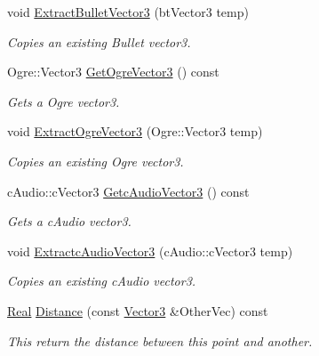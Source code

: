 \begin{DoxyCompactItemize}
void \hyperlink{classphys_1_1Vector3_a24ae86b068340be6727877f8c6c1a313}{ExtractBulletVector3} (btVector3 temp)
\begin{DoxyCompactList}\small\item\em Copies an existing Bullet vector3. \item\end{DoxyCompactList}\item 
Ogre::Vector3 \hyperlink{classphys_1_1Vector3_a17265d86a74139398d310b56ba7e89b8}{GetOgreVector3} () const 
\begin{DoxyCompactList}\small\item\em Gets a Ogre vector3. \item\end{DoxyCompactList}\item 
void \hyperlink{classphys_1_1Vector3_a09a31cb8fe491f61e0cc10d21705a0df}{ExtractOgreVector3} (Ogre::Vector3 temp)
\begin{DoxyCompactList}\small\item\em Copies an existing Ogre vector3. \item\end{DoxyCompactList}\item 
cAudio::cVector3 \hyperlink{classphys_1_1Vector3_a58b1ac39dfee4c360c16944a7e7f657d}{GetcAudioVector3} () const 
\begin{DoxyCompactList}\small\item\em Gets a cAudio vector3. \item\end{DoxyCompactList}\item 
void \hyperlink{classphys_1_1Vector3_aa12021e9cdc092c8628ced1c5910c04c}{ExtractcAudioVector3} (cAudio::cVector3 temp)
\begin{DoxyCompactList}\small\item\em Copies an existing cAudio vector3. \item\end{DoxyCompactList}\item 
\hyperlink{namespacephys_af7eb897198d265b8e868f45240230d5f}{Real} \hyperlink{classphys_1_1Vector3_af59a586331fe9497056b7e0f207658a3}{Distance} (const \hyperlink{classphys_1_1Vector3}{Vector3} \&OtherVec) const 
\begin{DoxyCompactList}\small\item\em This return the distance between this point and another. \item\end{DoxyCompactList}\end{DoxyCompactItemize}
